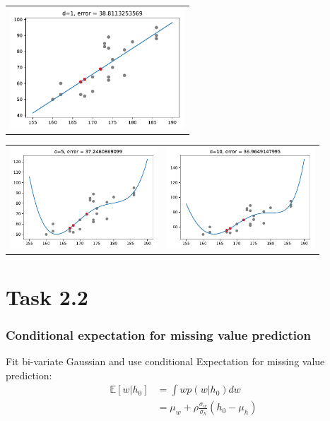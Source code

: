 \documentclass{beamer}
\begin{document}
\begin{frame}
\centering
\begin{tabular}{c}
	\includegraphics[width=6.5cm]{graphics/poly_1_coeffs}
\end{tabular}

\vspace{0.01em}
\begin{tabular}{cc}
	\includegraphics[width=5.5cm]{graphics/poly_5_coeffs}
	&
	\includegraphics[width=5.5cm]{graphics/poly_10_coeffs}
\end{tabular}
\end{frame}

\section{Task 2.2}

\begin{frame}
	\frametitle{Conditional expectation for missing value prediction}
	Fit bi-variate Gaussian and use conditional Expectation for missing value prediction:
	\begin{align*}
		\mathbb{E}[w|h_0] &= \int w p(w|h_0) dw \\
						  &= \mu_w + \rho \frac{\sigma_w}{\sigma_h}(h_0-\mu_h)
	\end{align*}
\end{frame}
\end{document}
